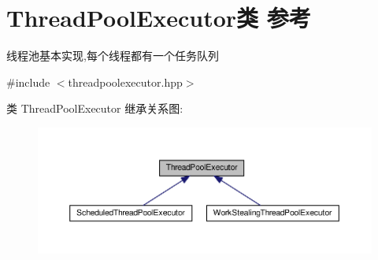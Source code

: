 \hypertarget{classThreadPoolExecutor}{}\section{Thread\+Pool\+Executor类 参考}
\label{classThreadPoolExecutor}


线程池基本实现,每个线程都有一个任务队列  




{\ttfamily \#include $<$threadpoolexecutor.\+hpp$>$}



类 Thread\+Pool\+Executor 继承关系图\+:\nopagebreak
\begin{figure}[H]
\begin{center}
\leavevmode
\includegraphics[width=350pt]{classThreadPoolExecutor__inherit__graph}
\end{center}
\end{figure}

